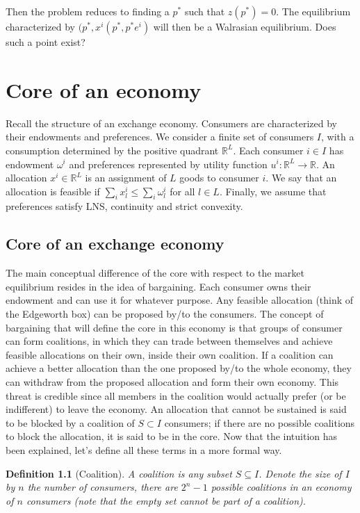 \documentclass[12pt]{report}
\newtheorem{definition}{Definition}[chapter]
\begin{document}
Then the problem reduces to finding a $p^*$ such that $z(p^*) = 0$. The equilibrium characterized by $(p^*, x^i(p^*,p^*e^i)$ will then be a Walrasian equilibrium. Does such a point exist?

\chapter{Core of an economy}

Recall the structure of an exchange economy. Consumers are characterized by their endowments and preferences. We consider a finite set of consumers $I$, with a consumption determined by the positive quadrant $\mathbb{R}^L$. Each consumer $i\in I$ has endowment $\omega^i$ and preferences represented by utility function $u^i:\mathbb{R}^L\to\mathbb{R}$. An allocation $x^i\in\mathbb{R}^L$ is an assignment of $L$ goods to consumer $i$. We say that an allocation is feasible if $\sum_i x_l^i \leq \sum_i \omega_l^i $ for all $l\in L$. Finally, we assume that preferences satisfy LNS, continuity and strict convexity.

\section{Core of an exchange economy}

The main conceptual difference of the core with respect to the market equilibrium resides in the idea of bargaining. Each consumer owns their endowment and can use it for whatever purpose. Any feasible allocation (think of the Edgeworth box) can be proposed by/to the consumers. The concept of bargaining that will define the core in this economy is that groups of consumer can form coalitions, in which they can trade between themselves and achieve feasible allocations on their own, inside their own coalition. If a coalition can achieve a better allocation than the one proposed by/to the whole economy, they can withdraw from the proposed allocation and form their own economy. This threat is credible since all members in the coalition would actually prefer (or be indifferent) to leave the economy. An allocation that cannot be sustained is said to be blocked by a coalition of $S\subset I$ consumers; if there are no possible coalitions to block the allocation, it is said to be in the core. Now that the intuition has been explained, let's define all these terms in a more formal way.

\begin{definition}[Coalition]
A coalition is any subset $S\subseteq I$. Denote the size of $I$ by $n$ the number of consumers, there are $2^n - 1$ possible coalitions in an economy of $n$ consumers (note that the empty set cannot be part of a coalition).
\end{definition}
\end{document}
